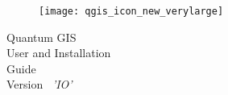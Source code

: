 \begin{titlepage}
\begin{center}

\begin{figure}[H]
\begin{center}
\texttt{[image: qgis\_icon\_new\_verylarge]} 
\end{center}
\end{figure}

\Huge{Quantum GIS}\\
\vspace{0.5cm}
\Large{User and Installation \\Guide} \\
\vspace{0.5cm}
\large{Version ~\CURRENT \textsl{'IO'}}


\end{center}
\end{titlepage}
